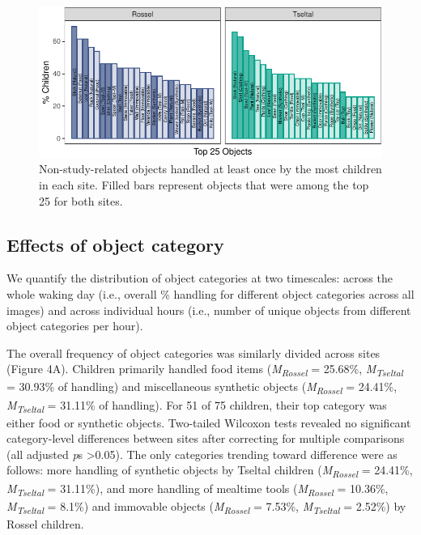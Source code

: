 \documentclass[10pt, letterpaper]{article}
\newenvironment{CodeChunk}{}{}
\begin{document}
\begin{CodeChunk}
\begin{figure}[!ht]

{\centering \includegraphics{figs/top-objects-fig-1} 

}

\caption[Non-study-related objects handled at least once by the most children in each site]{Non-study-related objects handled at least once by the most children in each site. Filled bars represent objects that were among the top 25 for both sites.}\label{fig:top-objects-fig}
\end{figure}
\end{CodeChunk}

\hypertarget{effects-of-object-category}{%
\subsection{Effects of object
category}\label{effects-of-object-category}}

We quantify the distribution of object categories at two timescales:
across the whole waking day (i.e., overall \% handling for different
object categories across all images) and across individual hours (i.e.,
number of unique objects from different object categories per hour).

The overall frequency of object categories was similarly divided across
sites (Figure 4A). Children primarily handled food items
(\emph{M}\textsubscript{\emph{Rossel}} = 25.68\%,
\emph{M}\textsubscript{\emph{Tseltal}} = 30.93\% of handling) and
miscellaneous synthetic objects (\emph{M}\textsubscript{\emph{Rossel}} =
24.41\%, \emph{M}\textsubscript{\emph{Tseltal}} = 31.11\% of handling).
For 51 of 75 children, their top category was either food or synthetic
objects. Two-tailed Wilcoxon tests revealed no significant
category-level differences between sites after correcting for multiple
comparisons (all adjusted \emph{p}s \textgreater0.05). The only
categories trending toward difference were as follows: more handling of
synthetic objects by Tseltal children
(\emph{M}\textsubscript{\emph{Rossel}} = 24.41\%,
\emph{M}\textsubscript{\emph{Tseltal}} = 31.11\%), and more handling of
mealtime tools (\emph{M}\textsubscript{\emph{Rossel}} = 10.36\%,
\emph{M}\textsubscript{\emph{Tseltal}} = 8.1\%) and immovable objects
(\emph{M}\textsubscript{\emph{Rossel}} = 7.53\%,
\emph{M}\textsubscript{\emph{Tseltal}} = 2.52\%) by Rossel children.
\end{document}
